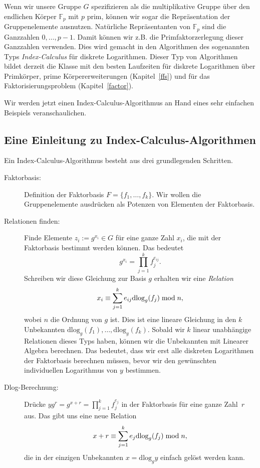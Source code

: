 \begin{refsegment}
Wenn wir unsere Gruppe $G$ spezifizieren als die multiplikative Gruppe über den endlichen Körper $\mathbb{F}_p$ mit $p$ prim, können wir sogar die Repräsentation der Gruppenelemente ausnutzen. Natürliche Repräsentanten von $\mathbb{F}_p$ sind die Ganzzahlen $0, \ldots, p-1$. Damit können wir z.B. die Primfaktorzerlegung dieser Ganzzahlen verwenden. Dies wird gemacht in den Algorithmen des sogenannten Typs {\em Index-Calculus} für diskrete Logarithmen. Dieser Typ von Algorithmen bildet derzeit die Klasse mit den besten Laufzeiten für diskrete Logarithmen über Primkörper, prime Körpererweiterungen (Kapitel~\ref{ffs}) und für das Faktorisierungsproblem (Kapitel~\ref{factor}).

Wir werden jetzt einen Index-Calculus-Algorithmus an Hand eines sehr einfachen Beispiels veranschaulichen.


\subsection{Eine Einleitung zu Index-Calculus-Algorithmen}
\label{simple}
Ein Index-Calculus-Algorithmus besteht aus drei grundlegenden Schritten.

\begin{description}
\item[Faktorbasis:] Definition der Faktorbasis $F=\{f_1, \ldots, f_k\}$. Wir wollen die Gruppenelemente ausdrücken als Potenzen von Elementen der Faktorbasis.

\item[Relationen finden:] Finde Elemente $z_i:=g^{x_i} \in G$ für eine ganze Zahl $x_i$, die mit der Faktorbasis bestimmt werden können. Das bedeutet
$$
  g^{x_i} = \prod_{j=1}^k f_j^{e_{ij}}.
$$
Schreiben wir diese Gleichung zur Basis $g$ erhalten wir eine {\em Relation}
$$
  x_i \equiv \sum_{j=1}^k e_{ij}\textrm{dlog}_g(f_j) \hspace{1mm}{\rm mod}\hspace{1mm} n,
$$
wobei $n$ die Ordnung von $g$ ist. Dies ist eine lineare Gleichung in den $k$ Unbekannten $\textrm{dlog}_g(f_1), \ldots, \textrm{dlog}_g(f_k)$. Sobald wir $k$ linear unabhängige Relationen dieses Typs haben, können wir die Unbekannten mit Linearer Algebra berechnen. Das bedeutet, dass wir erst alle diskreten Logarithmen der Faktorbasis berechnen müssen, bevor wir den gewünschten individuellen Logarithmus von $y$ bestimmen.

\item[Dlog-Berechnung:] Drücke $yg^r = g^{x+r} = \prod_{j=1}^k f_j^{e_j}$ in der Faktorbasis für eine ganze Zahl~$r$ aus.
Das gibt uns eine neue Relation
$$
  x+r \equiv \sum_{j=1}^k e_{j}\textrm{dlog}_g(f_j) \hspace{1mm}{\rm mod}\hspace{1mm} n,
$$
die in der einzigen Unbekannten $x=\textrm{dlog}_g y$ einfach gelöst werden kann.
\end{description}


\end{refsegment}
